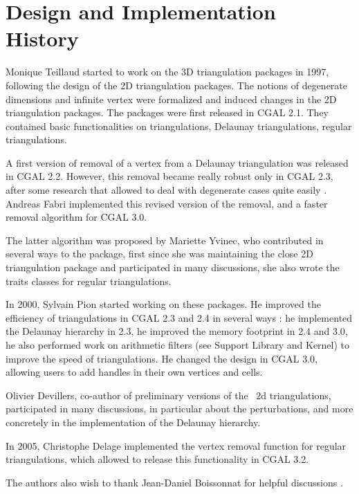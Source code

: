 
\section{Design and Implementation History}

Monique Teillaud started to work on the 3D triangulation packages in
1997, following the design of the 2D triangulation packages. The
notions of degenerate dimensions and infinite vertex were formalized
\cite{t-tdtc-99} and induced changes in the 2D triangulation
packages. The packages were first released in CGAL 2.1. They contained
basic functionalities on triangulations, Delaunay triangulations,
regular triangulations.

A first version of removal of a vertex from a Delaunay triangulation
was released in CGAL 2.2. However, this removal became really robust
only in CGAL 2.3, after some research that allowed to deal with
degenerate cases quite easily \cite{cgal:dt-pvr3d-03}. Andreas Fabri
implemented this revised version of the removal, and a faster removal
algorithm for CGAL 3.0. 

The latter algorithm was proposed by Mariette Yvinec, who contributed
in several ways to the package, first since she was maintaining the
close 2D triangulation package and participated in many discussions,
she also wrote the traits classes for regular triangulations.

In 2000, Sylvain Pion started working on these packages.  He improved
the efficiency of triangulations in CGAL 2.3 and 2.4 in several ways
\cite{cgal:bdpty-tc-02}: he implemented the Delaunay hierarchy
\cite{cgal:d-dh-02} in 2.3, he improved the memory footprint in 2.4
and 3.0, he also performed work on arithmetic filters
\cite{cgal:dp-eegpd-03} (see Support Library and Kernel) to improve
the speed of triangulations.  He changed the design in CGAL 3.0,
allowing users to add handles in their own vertices and cells.

Olivier Devillers, co-author of preliminary versions of the \cgal\ 2d
triangulations, participated in many discussions, in particular about
the perturbations, and more concretely in the implementation of the
Delaunay hierarchy. 

In 2005, Christophe Delage implemented the vertex removal function for
regular triangulations, which allowed to release this functionality in
CGAL 3.2.

The authors also wish to thank Jean-Daniel Boissonnat for helpful
discussions \cite{bdty-tcgal-00}.

